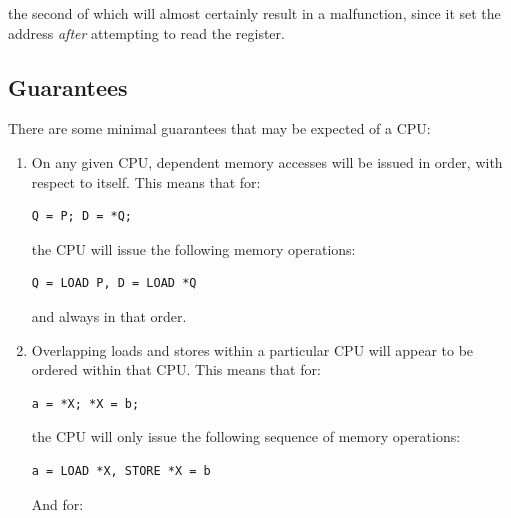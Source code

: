 the second of which will almost certainly result in a malfunction, since it set
the address \emph{after} attempting to read the register.

\subsection{Guarantees}
\label{sec:advsync:Guarantees}

There are some minimal guarantees that may be expected of a CPU:

\begin{enumerate}
\item	On any given CPU, dependent memory accesses will be issued in order,
	with respect to itself.  This means that for:

\begin{minipage}[t]{\columnwidth}
\scriptsize
\begin{verbatim}
Q = P; D = *Q;
\end{verbatim}
\end{minipage}

	the CPU will issue the following memory operations:

\begin{minipage}[t]{\columnwidth}
\scriptsize
\begin{verbatim}
Q = LOAD P, D = LOAD *Q
\end{verbatim}
\end{minipage}

	and always in that order.

\item	Overlapping loads and stores within a particular CPU will appear to be
	ordered within that CPU.  This means that for:

\begin{minipage}[t]{\columnwidth}
\scriptsize
\begin{verbatim}
a = *X; *X = b;
\end{verbatim}
\end{minipage}

	the CPU will only issue the following sequence of memory operations:

\begin{minipage}[t]{\columnwidth}
\scriptsize
\begin{verbatim}
a = LOAD *X, STORE *X = b
\end{verbatim}
\vspace{1pt}
\end{minipage}

	And for:


\end{enumerate}

